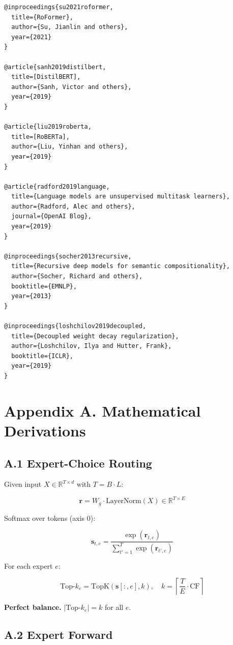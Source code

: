\begin{lstlisting}
@inproceedings{su2021roformer,
  title={RoFormer},
  author={Su, Jianlin and others},
  year={2021}
}

@article{sanh2019distilbert,
  title=[DistilBERT],
  author={Sanh, Victor and others},
  year={2019}
}

@article{liu2019roberta,
  title=[RoBERTa],
  author={Liu, Yinhan and others},
  year={2019}
}

@article{radford2019language,
  title={Language models are unsupervised multitask learners},
  author={Radford, Alec and others},
  journal={OpenAI Blog},
  year={2019}
}

@inproceedings{socher2013recursive,
  title={Recursive deep models for semantic compositionality},
  author={Socher, Richard and others},
  booktitle={EMNLP},
  year={2013}
}

@inproceedings{loshchilov2019decoupled,
  title={Decoupled weight decay regularization},
  author={Loshchilov, Ilya and Hutter, Frank},
  booktitle={ICLR},
  year={2019}
}
\end{lstlisting}



\section{Appendix A. Mathematical Derivations}

\subsection{A.1 Expert-Choice Routing}

Given input $X \in \mathbb{R}^{T \times d}$ with $T = B \cdot L$:

\[
\mathbf{r} = W_g \cdot \text{LayerNorm}(X) \in \mathbb{R}^{T \times E}
\tag{A.1}
\]

Softmax over tokens (axis 0):

\[
\mathbf{s}_{t, e} = \frac{\exp(\mathbf{r}_{t, e})}{\sum_{t'=1}^{T} \exp(\mathbf{r}_{t', e})}
\tag{A.2}
\]

For each expert $e$:

\[
\text{Top-}k_e = \text{TopK}(\mathbf{s}[:, e], k), \quad k = \left\lceil \frac{T}{E} \cdot \text{CF} \right\rceil
\tag{A.3}
\]

\textbf{Perfect balance.} $|\text{Top-}k_e| = k$ for all $e$.

\subsection{A.2 Expert Forward}

